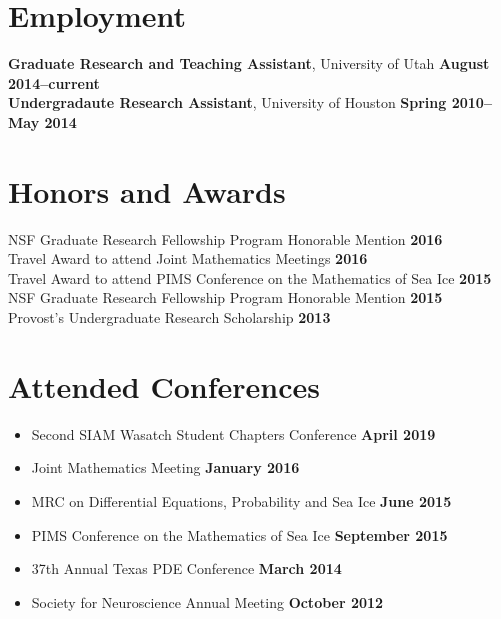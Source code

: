 \documentclass[margin,line]{res}
\begin{document}
\begin{resume}
\section{\sc Employment}
{\bf Graduate Research and Teaching Assistant}, University of Utah \hfill {\bf August 2014--current}\\
{\bf Undergradaute Research Assistant}, University of Houston \hfill {\bf Spring 2010--May 2014}\\

\section{\sc Honors and Awards}
{NSF Graduate Research Fellowship Program Honorable Mention} \hfill {\bf 2016}\\
{Travel Award to attend Joint Mathematics Meetings} \hfill {\bf 2016}\\
{Travel Award to attend PIMS Conference on the Mathematics of Sea Ice} \hfill {\bf 2015}\\
{NSF Graduate Research Fellowship Program Honorable Mention} \hfill {\bf 2015}\\
{Provost's Undergraduate Research Scholarship} \hfill {\bf 2013}\\
\ifx\nopubs\undefined

\else
\fi

\section{\sc Attended Conferences}
\begin{itemize}
\item[] Second SIAM Wasatch Student Chapters Conference
\hfill {\bf April 2019}
\item[] Joint Mathematics Meeting
\hfill {\bf January 2016}
\item[] MRC on Differential Equations, Probability and Sea Ice
\hfill {\bf June 2015}
\item[] PIMS Conference on the Mathematics of Sea Ice
\hfill {\bf September 2015}
\item[] 37th Annual Texas PDE Conference
\hfill {\bf March 2014}
\item[] Society for Neuroscience Annual Meeting
\hfill {\bf October 2012}
\end{itemize}


\end{resume}
\end{document}

